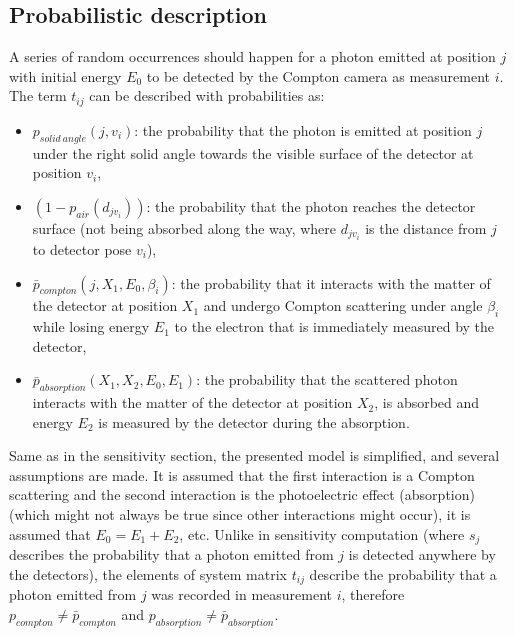 \subsection{Probabilistic description}
A series of random occurrences should happen for a photon emitted at position $j$ with initial energy $E_{0}$ to be detected by the Compton camera as measurement $i$.
The term $t_{ij}$ can be described with probabilities as:
\begin{itemize}
  \item $p_{solid\ angle}(j, v_{i}) $: the probability that the photon is emitted at position $j$ under the right solid angle towards the visible surface of the detector at position $v_{i}$,
  \item $(1-p_{air}(d_{jv_{i}}))$: the probability that the photon reaches the detector surface (not being absorbed along the way, where $d_{jv_{i}}$ is the distance from $j$ to detector pose $v_{i}$),
  \item $\bar{p}_{compton}(j, X_{1}, E_{0}, \beta_{i})$: the probability that it interacts with the matter of the detector at position $X_{1}$ and undergo Compton scattering under angle $\beta_{i}$ while losing energy $E_{1}$ to the electron that is immediately measured by the detector,
  \item $\bar{p}_{absorption}(X_{1}, X_{2}, E_{0}, E_{1})$: the probability that the scattered photon interacts with the matter of the detector at position $X_{2}$, is absorbed and energy $E_{2}$ is measured by the detector during the absorption.
\end{itemize}
Same as in the sensitivity section, the presented model is simplified, and several assumptions are made. 
It is assumed that the first interaction is a Compton scattering and the second interaction is the photoelectric effect (absorption) (which might not always be true since other interactions might occur), it is assumed that $E_{0} = E_{1} + E_{2}$, etc.
Unlike in sensitivity computation (where $s_{j}$ describes the probability that a photon emitted from $j$ is detected anywhere by the detectors), the elements of system matrix $t_{ij}$ describe the probability that a photon emitted from $j$ was recorded in measurement $i$, therefore $p_{compton}\neq \bar{p}_{compton}$ and  $p_{absorption}\neq \bar{p}_{absorption}$.

